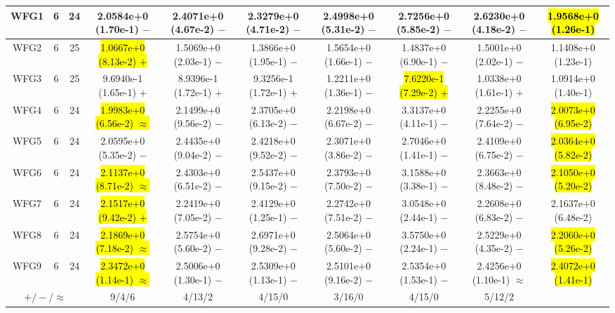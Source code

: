 \documentclass[journal]{IEEEtran}
\begin{document}
\begin{table*}[htbp]
\begin{tabular}{cccccccccc}
\hline
\multirow{1}{*}{WFG1}&6&24&2.0584e+0 (1.70e-1) $-$&2.4071e+0 (4.67e-2) $-$&2.3279e+0 (4.71e-2) $-$&2.4998e+0 (5.31e-2) $-$&2.7256e+0 (5.85e-2) $-$&2.6230e+0 (4.18e-2) $-$&\hl{1.9568e+0 (1.26e-1)}\\
\hline
\multirow{1}{*}{WFG2}&6&25&\hl{1.0667e+0 (8.13e-2) $+$}&1.5069e+0 (2.03e-1) $-$&1.3866e+0 (1.95e-1) $-$&1.5654e+0 (1.66e-1) $-$&1.4837e+0 (6.90e-1) $-$&1.5001e+0 (2.02e-1) $-$&1.1408e+0 (1.23e-1)\\
\hline
\multirow{1}{*}{WFG3}&6&25&9.6940e-1 (1.65e-1) $+$&8.9396e-1 (1.72e-1) $+$&9.3256e-1 (1.72e-1) $+$&1.2211e+0 (1.36e-1) $-$&\hl{7.6220e-1 (7.29e-2) $+$}&1.0338e+0 (1.61e-1) $+$&1.0914e+0 (1.40e-1)\\
\hline
\multirow{1}{*}{WFG4}&6&24&\hl{1.9983e+0 (6.56e-2) $\approx$}&2.1499e+0 (9.56e-2) $-$&2.3705e+0 (6.13e-2) $-$&2.2198e+0 (6.67e-2) $-$&3.3137e+0 (4.11e-1) $-$&2.2255e+0 (7.64e-2) $-$&\hl{2.0073e+0 (6.95e-2)}\\
\hline
\multirow{1}{*}{WFG5}&6&24&2.0595e+0 (5.35e-2) $-$&2.4435e+0 (9.04e-2) $-$&2.4218e+0 (9.52e-2) $-$&2.3071e+0 (3.86e-2) $-$&2.7046e+0 (1.41e-1) $-$&2.4109e+0 (6.75e-2) $-$&\hl{2.0364e+0 (5.82e-2)}\\
\hline
\multirow{1}{*}{WFG6}&6&24&\hl{2.1137e+0 (8.71e-2) $\approx$}&2.4303e+0 (6.51e-2) $-$&2.5437e+0 (9.15e-2) $-$&2.3793e+0 (7.50e-2) $-$&3.1588e+0 (3.38e-1) $-$&2.3663e+0 (8.48e-2) $-$&\hl{2.1050e+0 (5.20e-2)}\\
\hline
\multirow{1}{*}{WFG7}&6&24&\hl{2.1517e+0 (9.42e-2) $+$}&2.2419e+0 (7.05e-2) $-$&2.4129e+0 (1.25e-1) $-$&2.2742e+0 (7.51e-2) $-$&3.0548e+0 (2.44e-1) $-$&2.2608e+0 (6.83e-2) $-$&2.1637e+0 (6.48e-2)\\
\hline
\multirow{1}{*}{WFG8}&6&24&\hl{2.1869e+0 (7.18e-2) $\approx$}&2.5754e+0 (5.60e-2) $-$&2.6971e+0 (9.28e-2) $-$&2.5064e+0 (5.60e-2) $-$&3.5750e+0 (2.24e-1) $-$&2.5229e+0 (4.35e-2) $-$&\hl{2.2060e+0 (5.26e-2)}\\
\hline
\multirow{1}{*}{WFG9}&6&24&\hl{2.3472e+0 (1.14e-1) $\approx$}&2.5006e+0 (1.30e-1) $-$&2.5309e+0 (1.13e-1) $-$&2.5101e+0 (9.16e-2) $-$&2.5354e+0 (1.53e-1) $-$&2.4256e+0 (1.10e-1) $\approx$&\hl{2.4072e+0 (1.41e-1)}\\
\hline
\multicolumn{3}{c}{$+/-/\approx$}&9/4/6&4/13/2&4/15/0&3/16/0&4/15/0&5/12/2&\\
\bottomrule
\end{tabular}
\label{No Label}
\end{table*}
\end{document}
